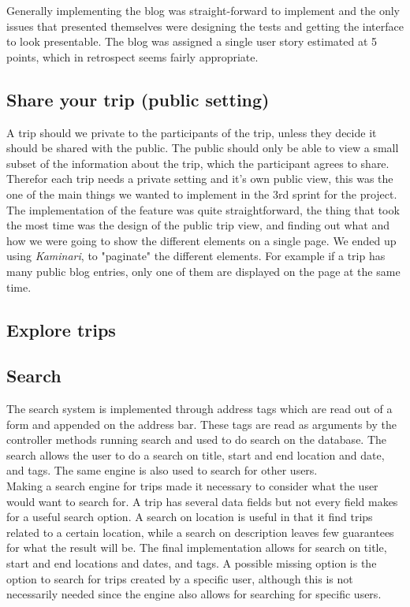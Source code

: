 \documentclass[a4paper]{article}
\begin{document}
\noindent
Generally implementing the blog was straight-forward to implement and the only issues that presented themselves were designing the tests and getting the interface to look presentable. The blog was assigned a single user story estimated at 5 points, which in retrospect seems fairly appropriate.

\subsection{Share your trip (public setting)}
A trip should we private to the participants of the trip, unless they decide it should be shared with the public. The public should only be able to view a small subset of the information about the trip, which the participant agrees to share.  Therefor each trip needs a private setting and it's own public view, this was the one of the main things we wanted to implement in the 3rd sprint for the project. \\

\noindent
The implementation of the feature was quite straightforward, the thing that took the most time was the design of the public trip view, and finding out what and how we were going to show the different elements on a single page. We ended up using \emph{Kaminari}\cite{kaminari}, to "paginate" the different elements. For example if a trip has many public blog entries, only one of them are displayed on the page at the same time. 

\subsection{Explore trips}

\subsection{Search}
The search system is implemented through address tags which are read out of a form and appended on the address bar. These tags are read as arguments by the controller methods running search and used to do search on the database. The search allows the user to do a search on title, start and end location and date, and tags. The same engine is also used to search for other users.\\

\noindent
Making a search engine for trips made it necessary to consider what the user would want to search for. A trip has several data fields but not every field makes for a useful search option. A search on location is useful in that it find trips related to a certain location, while a search on description leaves few guarantees for what the result will be. The final implementation allows for search on title, start and end locations and dates, and tags. A possible missing option is the option to search for trips created by a specific user, although this is not necessarily needed since the engine also allows for searching for specific users.\\
\end{document}
